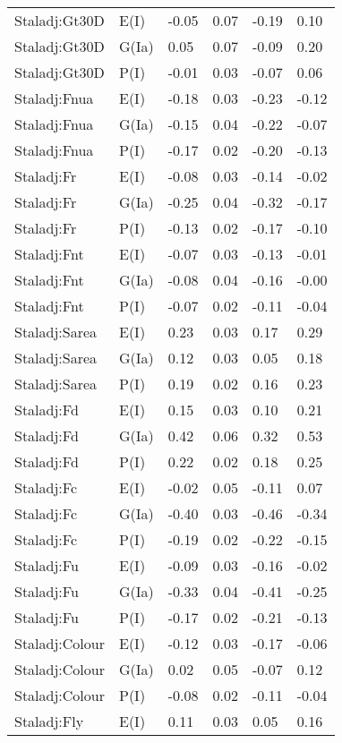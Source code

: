 \begin{center}
\begin{longtable}{|p{1.1in}|p{0.7in}|p{0.7in}|p{0.6in}|p{0.6in}|p{0.6in}|}
  Staladj:Gt30D & E(I) & -0.05 & 0.07 & -0.19 & 0.10 \\ 
  Staladj:Gt30D & G(Ia) & 0.05 & 0.07 & -0.09 & 0.20 \\ 
  Staladj:Gt30D & P(I) & -0.01 & 0.03 & -0.07 & 0.06 \\ 
  Staladj:Fnua & E(I) & -0.18 & 0.03 & -0.23 & -0.12 \\ 
  Staladj:Fnua & G(Ia) & -0.15 & 0.04 & -0.22 & -0.07 \\ 
  Staladj:Fnua & P(I) & -0.17 & 0.02 & -0.20 & -0.13 \\ 
  Staladj:Fr & E(I) & -0.08 & 0.03 & -0.14 & -0.02 \\ 
  Staladj:Fr & G(Ia) & -0.25 & 0.04 & -0.32 & -0.17 \\ 
  Staladj:Fr & P(I) & -0.13 & 0.02 & -0.17 & -0.10 \\ 
  Staladj:Fnt & E(I) & -0.07 & 0.03 & -0.13 & -0.01 \\ 
  Staladj:Fnt & G(Ia) & -0.08 & 0.04 & -0.16 & -0.00 \\ 
  Staladj:Fnt & P(I) & -0.07 & 0.02 & -0.11 & -0.04 \\ 
  Staladj:Sarea & E(I) & 0.23 & 0.03 & 0.17 & 0.29 \\ 
  Staladj:Sarea & G(Ia) & 0.12 & 0.03 & 0.05 & 0.18 \\ 
  Staladj:Sarea & P(I) & 0.19 & 0.02 & 0.16 & 0.23 \\ 
  Staladj:Fd & E(I) & 0.15 & 0.03 & 0.10 & 0.21 \\ 
  Staladj:Fd & G(Ia) & 0.42 & 0.06 & 0.32 & 0.53 \\ 
  Staladj:Fd & P(I) & 0.22 & 0.02 & 0.18 & 0.25 \\ 
  Staladj:Fc & E(I) & -0.02 & 0.05 & -0.11 & 0.07 \\ 
  Staladj:Fc & G(Ia) & -0.40 & 0.03 & -0.46 & -0.34 \\ 
  Staladj:Fc & P(I) & -0.19 & 0.02 & -0.22 & -0.15 \\ 
  Staladj:Fu & E(I) & -0.09 & 0.03 & -0.16 & -0.02 \\ 
  Staladj:Fu & G(Ia) & -0.33 & 0.04 & -0.41 & -0.25 \\ 
  Staladj:Fu & P(I) & -0.17 & 0.02 & -0.21 & -0.13 \\ 
  Staladj:Colour & E(I) & -0.12 & 0.03 & -0.17 & -0.06 \\ 
  Staladj:Colour & G(Ia) & 0.02 & 0.05 & -0.07 & 0.12 \\ 
  Staladj:Colour & P(I) & -0.08 & 0.02 & -0.11 & -0.04 \\ 
  Staladj:Fly & E(I) & 0.11 & 0.03 & 0.05 & 0.16 \\ 

\end{longtable}
\end{center}
